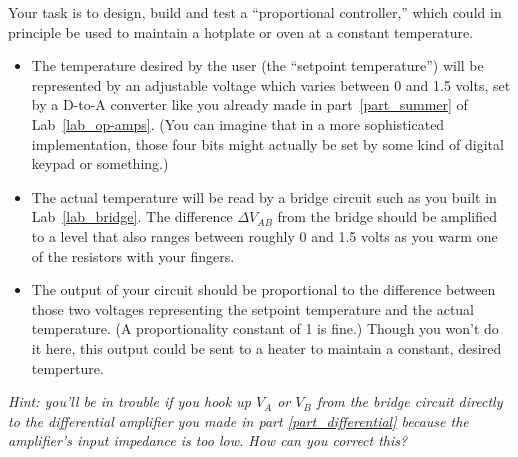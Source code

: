 Your task is to design, build and test a ``proportional controller,'' which could in principle be used to maintain a hotplate or oven at a constant temperature.
\begin{itemize}[nosep]
\item The temperature desired by the user (the ``setpoint temperature'') will be represented by an adjustable voltage which varies between 0 and 1.5 volts, set by a D-to-A converter like you already made in part~\ref{part_summer} of Lab~\ref{lab_op-amps}.  (You can imagine that in a more sophisticated implementation, those four bits might actually be set by some kind of digital keypad or something.)
\item The actual temperature will be read by a bridge circuit such as you built in Lab~\ref{lab_bridge}.  The difference $\Delta V_{AB}$ from the bridge should be amplified to a level that also ranges between roughly 0 and 1.5 volts as you warm one of the resistors with your fingers.
\item The output of your circuit should be proportional to the difference between those two voltages representing the setpoint temperature and the actual temperature.  (A proportionality constant of 1 is fine.)  Though you won't do it here, this output could be sent to a heater to maintain a constant, desired temperture.  
\end{itemize}
\textit{Hint: you'll be in trouble if you hook up $V_A$ or $V_B$ from the bridge circuit directly to the differential amplifier you made in part \ref{part_differential} because the amplifier's input impedance is too low.  How can you correct this?} 

